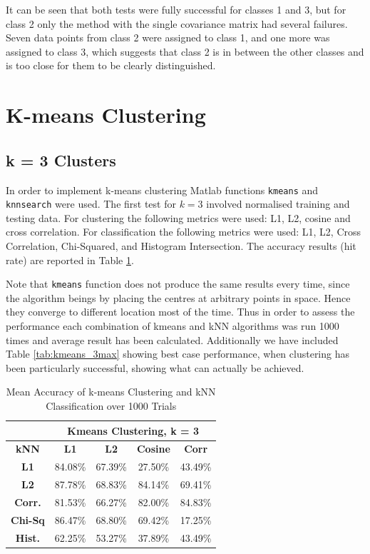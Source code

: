 \documentclass[10pt,twocolumn,letterpaper]{article}
\begin{document}
It can be seen that both tests were fully successful for classes 1 and 3, but for class 2 only the method with the single covariance matrix had several failures. Seven data points from class 2 were assigned to class 1, and one more was assigned to class 3, which suggests that class 2 is in between the other classes and is too close for them to be clearly distinguished. 

\section{K-means Clustering}
\subsection{k = 3 Clusters}
In order to implement k-means clustering Matlab functions {\tt\small kmeans} and {\tt\small knnsearch} were used. The first test for $k=3$ involved normalised training and testing data. For clustering the following metrics were used: L1, L2, cosine and cross correlation.
For classification the following metrics were used: L1, L2, Cross Correlation, Chi-Squared, and Histogram Intersection. The accuracy results (hit rate) are reported in Table \ref{tab:kmeans3}.

Note that {\tt\small kmeans} function does not produce the same results every time, since the algorithm beings by placing the centres at arbitrary points in space. Hence they converge to different location most of the time. Thus in order to assess the performance each combination of kmeans and kNN algorithms was run 1000 times and average result has been calculated. Additionally we have included Table \ref{tab:kmeans_3max} showing best case performance, when clustering has been particularly successful, showing what can actually be achieved.

\vspace{2mm}

\begin{table}[H]
\caption{Mean Accuracy of k-means Clustering and kNN Classification over 1000 Trials \label{tab:kmeans3}}
\small
\begin{center}
\begin{tabular}{|c| c c c c|}
\cline{2-5}
\multicolumn{1}{c|}{ } & \multicolumn{4}{|c|}{\bf Kmeans Clustering, k = 3} \\
\hline

\bf kNN &\bf L1 &\bf L2 &\bf Cosine &\bf Corr \\ [0.5ex]
\hline
\bf L1 & 84.08\% & 67.39\%  & 27.50\% & 43.49\%\\ [0.5ex]
\hline
\bf L2 & 87.78\% & 68.83\%  & 84.14\% & 69.41\%\\ [0.5ex]
\hline
\bf Corr. & 81.53\% & 66.27\%  & 82.00\% & 84.83\%\\ [0.5ex]
\hline
\bf Chi-Sq & 86.47\% & 68.80\%  & 69.42\% & 17.25\%\\ [0.5ex]
\hline
\bf Hist. & 62.25\% & 53.27\%  & 37.89\% & 43.49\%\\ [0.5ex]
\hline
\end{tabular}
\end{center}
\end{table}
\end{document}
